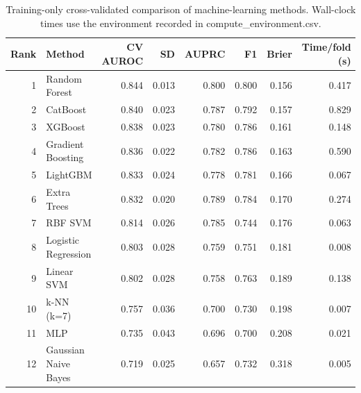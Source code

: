 \begin{table}[htbp]
\centering
\caption{Training-only cross-validated comparison of machine-learning methods. Wall-clock times use the environment recorded in compute_environment.csv.}
\label{tab:method_comparison_recomputed}
\begin{tabular}{rlrrrrrr}
\toprule
Rank & Method & CV AUROC & SD & AUPRC & F1 & Brier & Time/fold (s) \\
\midrule
1 & Random Forest & 0.844 & 0.013 & 0.800 & 0.800 & 0.156 & 0.417 \\
2 & CatBoost & 0.840 & 0.023 & 0.787 & 0.792 & 0.157 & 0.829 \\
3 & XGBoost & 0.838 & 0.023 & 0.780 & 0.786 & 0.161 & 0.148 \\
4 & Gradient Boosting & 0.836 & 0.022 & 0.782 & 0.786 & 0.163 & 0.590 \\
5 & LightGBM & 0.833 & 0.024 & 0.778 & 0.781 & 0.166 & 0.067 \\
6 & Extra Trees & 0.832 & 0.020 & 0.789 & 0.784 & 0.170 & 0.274 \\
7 & RBF SVM & 0.814 & 0.026 & 0.785 & 0.744 & 0.176 & 0.063 \\
8 & Logistic Regression & 0.803 & 0.028 & 0.759 & 0.751 & 0.181 & 0.008 \\
9 & Linear SVM & 0.802 & 0.028 & 0.758 & 0.763 & 0.189 & 0.138 \\
10 & k-NN (k=7) & 0.757 & 0.036 & 0.700 & 0.730 & 0.198 & 0.007 \\
11 & MLP & 0.735 & 0.043 & 0.696 & 0.700 & 0.208 & 0.021 \\
12 & Gaussian Naive Bayes & 0.719 & 0.025 & 0.657 & 0.732 & 0.318 & 0.005 \\
\bottomrule
\end{tabular}

\end{table}

